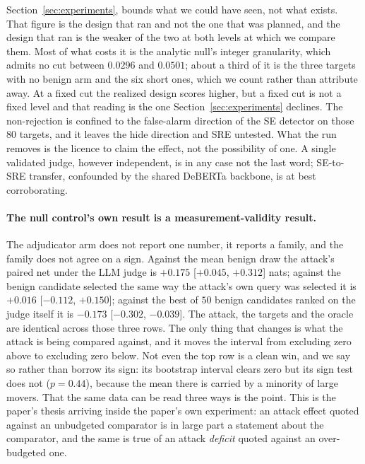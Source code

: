 Section~\ref{sec:experiments}, bounds what we could have seen, not what exists. That figure is
the design that ran and not the
one that was planned, and the design that ran is the weaker of the two at both levels at which we
compare them. Most of what costs it is the analytic null's integer granularity, which admits
no cut between $0.0296$ and $0.0501$; about a third of it is the three targets with no benign
arm and the six short ones, which we count rather than attribute away. At a fixed cut the
realized design scores higher, but a fixed cut is not a fixed level and that reading is the one
Section~\ref{sec:experiments} declines. The non-rejection is confined to the false-alarm direction
of the SE detector on those $80$ targets, and it leaves the hide direction and SRE untested.
What the run removes is the licence to claim the effect, not the possibility of one. A single
validated judge, however independent, is in any case not the
last word; SE-to-SRE transfer, confounded by the shared DeBERTa backbone, is at best
corroborating.

\paragraph{The null control's own result is a measurement-validity result.}
The adjudicator arm does not report one number, it reports a family, and the family does not
agree on a sign. Against the mean benign draw the attack's paired net under the LLM judge is
$+0.175$ [$+0.045$, $+0.312$] nats; against the benign candidate selected the same way the
attack's own query was selected it is $+0.016$ [$-0.112$, $+0.150$]; against the best of
$50$ benign candidates ranked on the judge itself it is $-0.173$ [$-0.302$, $-0.039$]. The
attack, the targets and the oracle are identical across those three rows. The only thing
that changes is what the attack is being compared against, and it moves the interval from
excluding zero above to excluding zero below. Not even the top row is a clean win, and we
say so rather than borrow its sign: its bootstrap interval clears zero but its sign test
does not ($p{=}0.44$), because the mean there is carried by a minority of large movers. That
the same data can be read three ways is the point. This is the paper's thesis arriving inside the
paper's own experiment: an attack effect quoted against an unbudgeted comparator is in large
part a statement about the comparator, and the same is true of an attack \emph{deficit}
quoted against an over-budgeted one.

